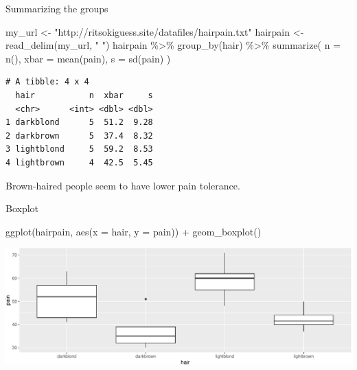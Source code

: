 \documentclass[
  ignorenonframetext,
]{beamer}
\newenvironment{Shaded}{\begin{snugshade}}{\end{snugshade}}
\newcommand{\AttributeTok}[1]{\textcolor[rgb]{0.40,0.45,0.13}{#1}}
\newcommand{\FunctionTok}[1]{\textcolor[rgb]{0.28,0.35,0.67}{#1}}
\newcommand{\NormalTok}[1]{\textcolor[rgb]{0.00,0.23,0.31}{#1}}
\newcommand{\OtherTok}[1]{\textcolor[rgb]{0.00,0.23,0.31}{#1}}
\newcommand{\SpecialCharTok}[1]{\textcolor[rgb]{0.37,0.37,0.37}{#1}}
\newcommand{\StringTok}[1]{\textcolor[rgb]{0.13,0.47,0.30}{#1}}
\begin{document}
\begin{frame}[fragile]{Summarizing the groups}
\protect\hypertarget{summarizing-the-groups}{}
\footnotesize

\begin{Shaded}
\begin{Highlighting}[]
\NormalTok{my\_url }\OtherTok{\textless{}{-}} \StringTok{"http://ritsokiguess.site/datafiles/hairpain.txt"}
\NormalTok{hairpain }\OtherTok{\textless{}{-}} \FunctionTok{read\_delim}\NormalTok{(my\_url, }\StringTok{" "}\NormalTok{)}
\NormalTok{hairpain }\SpecialCharTok{\%\textgreater{}\%}
  \FunctionTok{group\_by}\NormalTok{(hair) }\SpecialCharTok{\%\textgreater{}\%}
  \FunctionTok{summarize}\NormalTok{(}
    \AttributeTok{n =} \FunctionTok{n}\NormalTok{(),}
    \AttributeTok{xbar =} \FunctionTok{mean}\NormalTok{(pain),}
    \AttributeTok{s =} \FunctionTok{sd}\NormalTok{(pain)}
\NormalTok{  )}
\end{Highlighting}
\end{Shaded}

\begin{verbatim}
# A tibble: 4 x 4
  hair           n  xbar     s
  <chr>      <int> <dbl> <dbl>
1 darkblond      5  51.2  9.28
2 darkbrown      5  37.4  8.32
3 lightblond     5  59.2  8.53
4 lightbrown     4  42.5  5.45
\end{verbatim}

\normalsize

Brown-haired people seem to have lower pain tolerance.
\end{frame}

\begin{frame}[fragile]{Boxplot}
\protect\hypertarget{boxplot}{}
\begin{Shaded}
\begin{Highlighting}[]
\FunctionTok{ggplot}\NormalTok{(hairpain, }\FunctionTok{aes}\NormalTok{(}\AttributeTok{x =}\NormalTok{ hair, }\AttributeTok{y =}\NormalTok{ pain)) }\SpecialCharTok{+} \FunctionTok{geom\_boxplot}\NormalTok{()}
\end{Highlighting}
\end{Shaded}

\includegraphics{anova_files/figure-beamer/tartuffo-1.pdf}
\end{frame}
\end{document}
